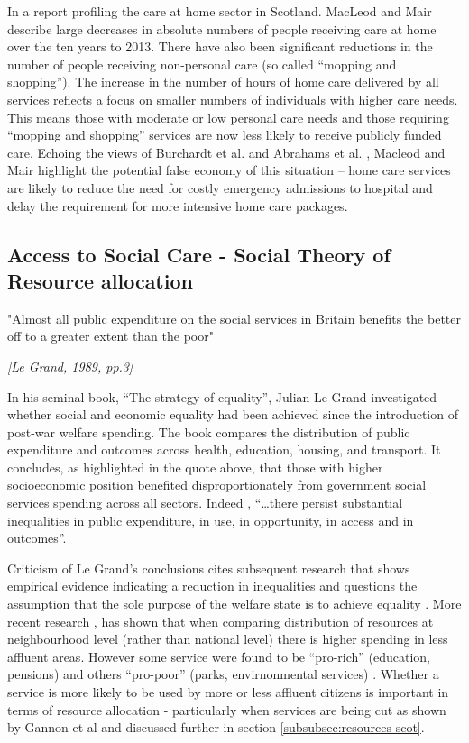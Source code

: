 \documentclass[12pt,]{report}
\begin{document}
In a report profiling the care at home sector in Scotland. MacLeod and
Mair \citeyearpar{RN147} describe large decreases in absolute numbers of
people receiving care at home over the ten years to 2013. There have
also been significant reductions in the number of people receiving
non-personal care (so called ``mopping and shopping''). The increase in
the number of hours of home care delivered by all services reflects a
focus on smaller numbers of individuals with higher care needs. This
means those with moderate or low personal care needs and those requiring
``mopping and shopping'' services are now less likely to receive
publicly funded care. Echoing the views of Burchardt et al.
\citeyearpar{RN173} and Abrahams et al. \citeyearpar{RN177}, Macleod and
Mair \citeyearpar{RN147} highlight the potential false economy of this
situation -- home care services are likely to reduce the need for costly
emergency admissions to hospital and delay the requirement for more
intensive home care packages.

\subsection{Access to Social Care - Social Theory of Resource allocation}\label{subsubsec:theory-resources}

\epigraph{"Almost all public expenditure on the social services in Britain benefits the better off to a greater extent than the poor"}{\textit{[Le Grand, 1989, pp.3]}}

In his seminal book, ``The strategy of equality'', Julian Le Grand
\citeyearpar{RN175} investigated whether social and economic equality
had been achieved since the introduction of post-war welfare spending.
The book compares the distribution of public expenditure and outcomes
across health, education, housing, and transport. It concludes, as
highlighted in the quote above, that those with higher socioeconomic
position benefited disproportionately from government social services
spending across all sectors. Indeed , ``\ldots{}there persist
substantial inequalities in public expenditure, in use, in opportunity,
in access and in outcomes''\citep[pp.4]{RN175}.

Criticism of Le Grand's conclusions cites subsequent research that shows
empirical evidence indicating a reduction in inequalities and questions
the assumption that the sole purpose of the welfare state is to achieve
equality \citep{RN113}. More recent research \citetext{\citealp[ cited
in]{RN440}; \citealp{RN116}},\citep{RN441, RN115} has shown that when
comparing distribution of resources at neighbourhood level (rather than
national level) there is higher spending in less affluent areas. However
some service were found to be ``pro-rich'' (education, pensions) and
others ``pro-poor'' (parks, envirnonmental services) \citetext{\citealp[
cited in]{RN440}; \citealp{RN116}}. Whether a service is more likely to
be used by more or less affluent citizens is important in terms of
resource allocation - particularly when services are being cut as shown
by Gannon et al \citeyearpar{RN235} and discussed further in section
\ref{subsubsec:resources-scot}.
\end{document}
